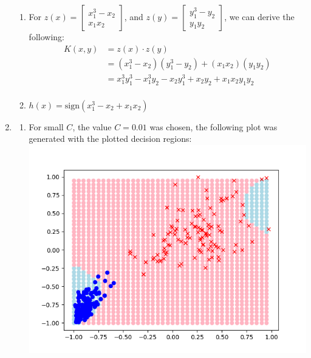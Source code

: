 \documentclass{article}
\begin{document}
\begin{enumerate}
\begin{enumerate}[label=(\alph*)]
            \item For $z(x) = \begin{bmatrix}
                    x^3_1 - x_2\\
                    x_1x_2
                \end{bmatrix}$, and $z(y) = \begin{bmatrix}
                    y^3_1 - y_2\\
                    y_1y_2
                \end{bmatrix}$, we can derive the following:
                \begin{align*}
                    K(x,y) &= z(x) \cdot z(y)\\
                    &= (x^3_1 - x_2)(y^3_1 - y_2) + (x_1x_2)(y_1y_2)\\
                    &= x^3_1y^3_1 - x^3_1y_2 - x_2y^3_1 + x_2y_2 + x_1x_2y_1y_2\\
                \end{align*}
            \item $h(x) = \text{sign}(x^3_1 - x_2 + x_1x_2)$
        \end{enumerate}
    \item \begin{enumerate}[label=(\alph*)]
        \item For small $C$, the value $C = 0.01$ was chosen, the following plot was generated with the plotted decision regions:\\\includegraphics[scale=0.5]{images/4aregsmall.png}

\end{enumerate}
\end{enumerate}
\end{document}
